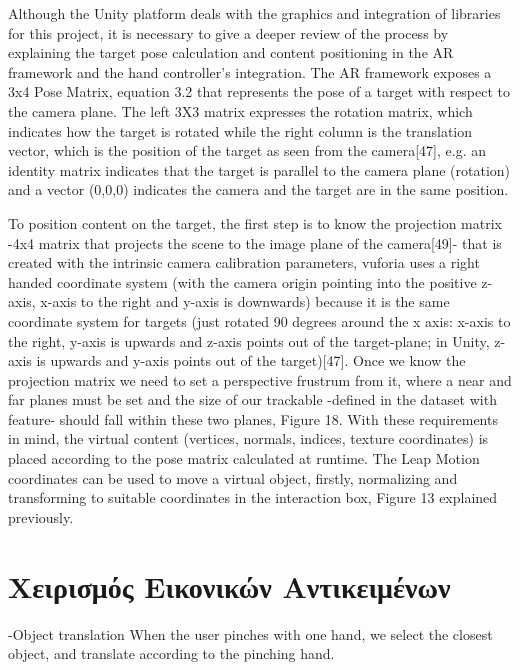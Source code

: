 Although the Unity platform deals with the graphics and integration of libraries for this project, it is necessary to give a deeper review of the process by explaining the target pose calculation and content positioning in the AR framework and the hand controller’s integration. The AR framework exposes a 3x4 Pose Matrix, equation 3.2 that represents the pose of a target with respect to the camera plane. The left 3X3 matrix expresses the rotation matrix, which indicates how the target is rotated while the right column is the translation vector, which is the position of the target as seen from the camera[47], e.g. an identity matrix indicates that the target is parallel to the camera plane (rotation) and a vector (0,0,0) indicates the camera and the target are in the same position.

To position content on the target, the first step is to know the projection matrix -4x4 matrix that projects the scene to the image plane of the camera[49]- that is created with the intrinsic camera calibration parameters, vuforia uses a right handed coordinate system (with the camera origin pointing into the positive z-axis, x-axis to the right and y-axis is downwards) because it is the same coordinate system for targets (just rotated 90 degrees around the x axis: x-axis to the right, y-axis is upwards and z-axis points out of the target-plane; in Unity, z-axis is upwards and y-axis points out of the target)[47]. Once we know the projection matrix we need to set a perspective frustrum from it, where a near and far planes must be set and the size of our trackable -defined in the dataset with feature- should fall within these two planes, Figure 18.
With these requirements in mind, the virtual content (vertices, normals, indices, texture coordinates)
is placed according to the pose matrix calculated at runtime.
The Leap Motion coordinates can be used to move a virtual object, firstly, normalizing and
transforming to suitable coordinates in the interaction box, Figure 13 explained previously.

\section{Χειρισμός Εικονικών Αντικειμένων} \label{s:manipulation}

-Object translation 
When the user pinches with one hand,
we select the closest object, and translate according to the
pinching hand.


